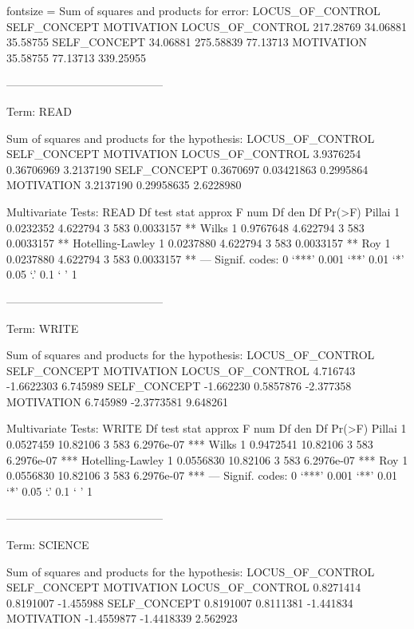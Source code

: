 \documentclass{article}
\begin{document}
\begin{enumerate}[leftmargin = 0 em, label = \arabic*., font = \bfseries]
\begin{enumerate}
\begin{rcode*}{fontsize = \footnotesize}
Sum of squares and products for error:
                 LOCUS_OF_CONTROL SELF_CONCEPT MOTIVATION
LOCUS_OF_CONTROL        217.28769     34.06881   35.58755
SELF_CONCEPT             34.06881    275.58839   77.13713
MOTIVATION               35.58755     77.13713  339.25955

------------------------------------------
 
Term: READ 

Sum of squares and products for the hypothesis:
                 LOCUS_OF_CONTROL SELF_CONCEPT MOTIVATION
LOCUS_OF_CONTROL        3.9376254   0.36706969  3.2137190
SELF_CONCEPT            0.3670697   0.03421863  0.2995864
MOTIVATION              3.2137190   0.29958635  2.6228980

Multivariate Tests: READ
                 Df test stat approx F num Df den Df    Pr(>F)   
Pillai            1 0.0232352 4.622794      3    583 0.0033157 **
Wilks             1 0.9767648 4.622794      3    583 0.0033157 **
Hotelling-Lawley  1 0.0237880 4.622794      3    583 0.0033157 **
Roy               1 0.0237880 4.622794      3    583 0.0033157 **
---
Signif. codes:  0 ‘***’ 0.001 ‘**’ 0.01 ‘*’ 0.05 ‘.’ 0.1 ‘ ’ 1

------------------------------------------
 
Term: WRITE 

Sum of squares and products for the hypothesis:
                 LOCUS_OF_CONTROL SELF_CONCEPT MOTIVATION
LOCUS_OF_CONTROL         4.716743   -1.6622303   6.745989
SELF_CONCEPT            -1.662230    0.5857876  -2.377358
MOTIVATION               6.745989   -2.3773581   9.648261

Multivariate Tests: WRITE
                 Df test stat approx F num Df den Df     Pr(>F)    
Pillai            1 0.0527459 10.82106      3    583 6.2976e-07 ***
Wilks             1 0.9472541 10.82106      3    583 6.2976e-07 ***
Hotelling-Lawley  1 0.0556830 10.82106      3    583 6.2976e-07 ***
Roy               1 0.0556830 10.82106      3    583 6.2976e-07 ***
---
Signif. codes:  0 ‘***’ 0.001 ‘**’ 0.01 ‘*’ 0.05 ‘.’ 0.1 ‘ ’ 1

------------------------------------------
 
Term: SCIENCE 

Sum of squares and products for the hypothesis:
                 LOCUS_OF_CONTROL SELF_CONCEPT MOTIVATION
LOCUS_OF_CONTROL        0.8271414    0.8191007  -1.455988
SELF_CONCEPT            0.8191007    0.8111381  -1.441834
MOTIVATION             -1.4559877   -1.4418339   2.562923


\end{rcode*}
\end{enumerate}
\end{enumerate}
\end{document}
